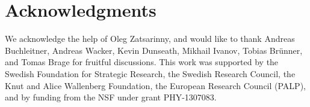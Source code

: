 \section{Acknowledgments}
\label{sec:acknowledgements}
We acknowledge the help of Oleg Zatsarinny, and would like to thank
Andreas Buchleitner, Andreas Wacker, Kevin Dunseath, Mikhail Ivanov,
Tobias Brünner, and Tomas Brage for fruitful discussions. This work
was supported by the Swedish Foundation for Strategic Research, the
Swedish Research Council, the Knut and Alice Wallenberg Foundation,
the European Research Council (PALP), and by funding from the
NSF under grant PHY-1307083.